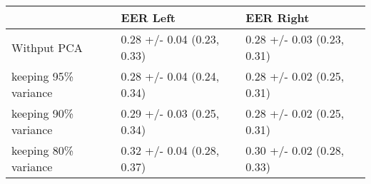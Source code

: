 \begin{tabular}{lll}
\toprule
{} &                    EER Left &                   EER Right \\
\midrule
Withput PCA          &  0.28 +/- 0.04 (0.23, 0.33) &  0.28 +/- 0.03 (0.23, 0.31) \\
keeping 95\% variance &  0.28 +/- 0.04 (0.24, 0.34) &  0.28 +/- 0.02 (0.25, 0.31) \\
keeping 90\% variance &  0.29 +/- 0.03 (0.25, 0.34) &  0.28 +/- 0.02 (0.25, 0.31) \\
keeping 80\% variance &  0.32 +/- 0.04 (0.28, 0.37) &  0.30 +/- 0.02 (0.28, 0.33) \\
\bottomrule
\end{tabular}
